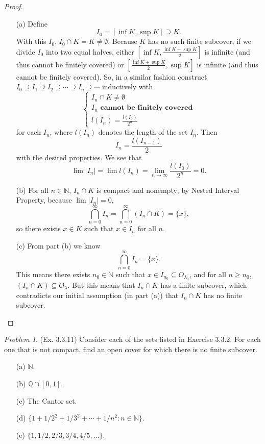 \documentclass[11pt,twoside, reqno]{amsart}
\theoremstyle{remark}
\newtheorem{Prob}{Problem}
\def\Q{\mathbb Q}
\def\N{\mathbb N}
\begin{document}
\begin{proof}
\begin{enumerate}
    \item [(a)] Define
    $$
        I_0 = [\inf K, \sup K] \supseteq K.
    $$
    With this $I_0$, $I_0 \cap K = K \neq \emptyset$. Because $K$ has no such finite subcover, if we divide $I_0$ into two equal halves, either $[\inf K, \frac{\inf K + \sup K}{2}]$ is infinite (and thus cannot be finitely covered) or $[\frac{\inf K + \sup K}{2}, \sup K]$ is infinite (and thus cannot be finitely covered). So, in a similar fashion construct $I_0 \supseteq I_1 \supseteq I_2 \supseteq \cdots \supseteq I_n \supseteq \cdots$ inductively with
    $$
    \begin{cases}
        I_n \cap K \neq \emptyset \\
        I_n \textbf{ cannot be finitely covered}\\
        l(I_n) = \frac{l(I_0)}{2^n}
    \end{cases}
    $$
    for each $I_n$, where $l(I_n)$ denotes the length of the set $I_n$. Then
    $$
        I_n = \frac{l(I_{n-1})}{2}
    $$
    with the desired properties. We see that
    $$
    \lim|I_n| = \lim l(I_n) = \lim_{n\to \infty} \frac{l(I_0)}{2^n} = 0.
    $$
    \item [(b)] For all $n \in \N$, $I_n \cap K$ is compact and nonempty; by Nested Interval Property, because $\lim|I_n| = 0$,
    $$
        \bigcap^\infty_{n=0} I_n = \bigcap^\infty_{n=0} (I_n \cap K) = \{x\},
    $$
    so there exists $x \in K$ such that $x \in I_n$ for all $n$.
    \item [(c)] From part (b) we know
    $$
        \bigcap^\infty_{n=0} I_n = \{x\}.
    $$
    This means there exists $n_0 \in \N$ such that $x \in I_{n_0} \subseteq O_{\lambda_0}$, and for all $n \geq n_0$, $(I_n \cap K) \subseteq O_\lambda$. But this means that $I_n \cap K$ has a finite subcover, which contradicts our initial assumption (in part (a)) that $I_n \cap K$ has no finite subcover.
\end{enumerate}

\end{proof}

\begin{Prob}(Ex. 3.3.11) Consider each of the sets listed in Exercise 3.3.2. For each one that is not compact, find an open cover for which there is no finite subcover.
\begin{enumerate}
    \item [(a)] $\N$.
    \item [(b)] $\Q \cap [0,1]$.
    \item [(c)] The Cantor set.
    \item [(d)] $\{1 + 1/2^2 + 1/3^2 + \cdots + 1/n^2 : n \in \N\}$.
    \item [(e)] $\{1,1/2,2/3,3/4,4/5,\ldots\}$.
\end{enumerate}
\end{Prob}
\end{document}
